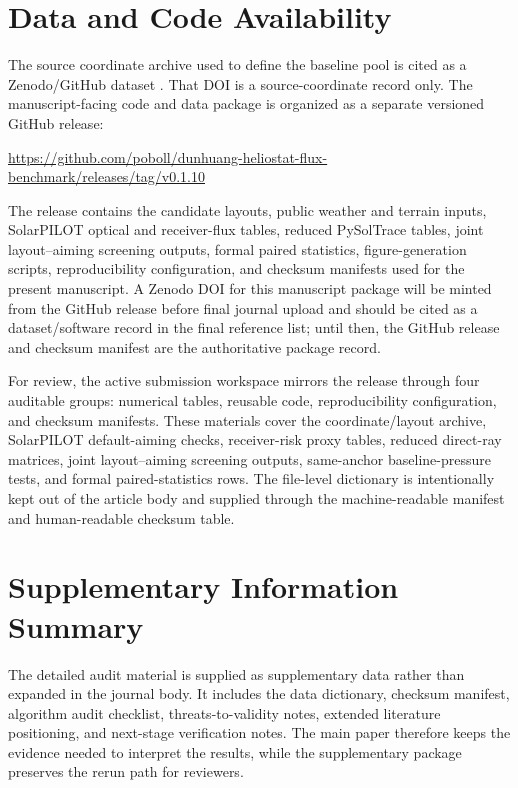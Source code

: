 \documentclass[final,3p,times]{elsarticle}
\begin{document}
\section{Data and Code Availability}
The source coordinate archive used to define the baseline pool is cited as a Zenodo/GitHub dataset \cite{zaihu2025dunhuangdataset}. That DOI is a source-coordinate record only. The manuscript-facing code and data package is organized as a separate versioned GitHub release:
\begin{center}
\small\url{https://github.com/poboll/dunhuang-heliostat-flux-benchmark/releases/tag/v0.1.10}
\end{center}
The release contains the candidate layouts, public weather and terrain inputs, SolarPILOT optical and receiver-flux tables, reduced PySolTrace tables, joint layout--aiming screening outputs, formal paired statistics, figure-generation scripts, reproducibility configuration, and checksum manifests used for the present manuscript. A Zenodo DOI for this manuscript package will be minted from the GitHub release before final journal upload and should be cited as a dataset/software record in the final reference list; until then, the GitHub release and checksum manifest are the authoritative package record.

For review, the active submission workspace mirrors the release through four auditable groups: numerical tables, reusable code, reproducibility configuration, and checksum manifests. These materials cover the coordinate/layout archive, SolarPILOT default-aiming checks, receiver-risk proxy tables, reduced direct-ray matrices, joint layout--aiming screening outputs, same-anchor baseline-pressure tests, and formal paired-statistics rows. The file-level dictionary is intentionally kept out of the article body and supplied through the machine-readable manifest and human-readable checksum table.

\section{Supplementary Information Summary}
The detailed audit material is supplied as supplementary data rather than expanded in the journal body. It includes the data dictionary, checksum manifest, algorithm audit checklist, threats-to-validity notes, extended literature positioning, and next-stage verification notes. The main paper therefore keeps the evidence needed to interpret the results, while the supplementary package preserves the rerun path for reviewers.
\end{document}
